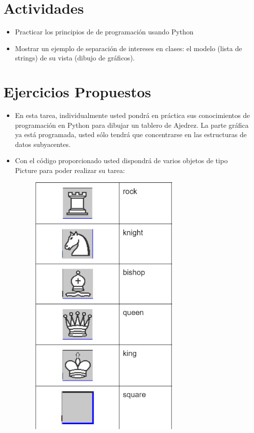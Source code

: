\documentclass{article}
\begin{document}
\section{Actividades}
	\begin{itemize}		
		\item Practicar los principios de de programación usando Python
		\item Mostrar un ejemplo de separación de intereses en clases: el modelo (lista de strings) de su vista (dibujo de gráficos).
	\end{itemize}

\section{Ejercicios Propuestos}
	\begin{itemize}		
		\item En esta tarea, individualmente usted pondrá en práctica sus conocimientos de programación en Python para dibujar un tablero de Ajedrez. La parte gráfica ya está programada, usted sólo tendrá que concentrarse en las estructuras de datos subyacentes.
		\item Con el código proporcionado usted dispondrá de varios objetos de tipo Picture para poder realizar su tarea:
		\begin{figure}[H]
		\centering
		\includegraphics[width=0.7\textwidth,keepaspectratio]{img/Piezas.png}

\end{figure}
\end{itemize}
\end{document}
